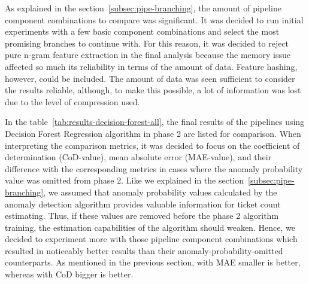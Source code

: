 As explained in the section~\ref{subsec:pipe-branching},
the amount of pipeline component combinations to compare was significant.
It was decided to run initial experiments with a few basic component combinations
and select the most promising branches to continue with.
For this reason,
it was decided to reject pure n-gram feature extraction in the final analysis
because the memory issue affected so much its reliability in terms of the amount of data.
Feature hashing, however,
could be included.
The amount of data was seen sufficient to consider the results reliable,
although, to make this possible,
a lot of information was lost due to the level of compression used.

In the table~\ref{tab:results-decision-forest-all},
the final results of the pipelines using Decision Forest Regression algorithm in phase 2
are listed for comparison.
When interpreting the comparison metrics,
it was decided to focus on the coefficient of determination (CoD-value),
mean absolute error (MAE-value),
and their difference with the corresponding metrics
in cases where the anomaly probability value was omitted from phase 2.
Like we explained in the section~\ref{subsec:pipe-branching},
we assumed that anomaly probability values calculated by the anomaly detection algorithm
provides valuable information for ticket count estimating.
Thus,
if these values are removed before the phase 2 algorithm training,
the estimation capabilities of the algorithm should weaken.
Hence,
we decided to experiment more with those pipeline component combinations
which resulted in noticeably better results
than their anomaly-probability-omitted counterparts.
As mentioned in the previous section,
with MAE smaller is better,
whereas with CoD bigger is better.

